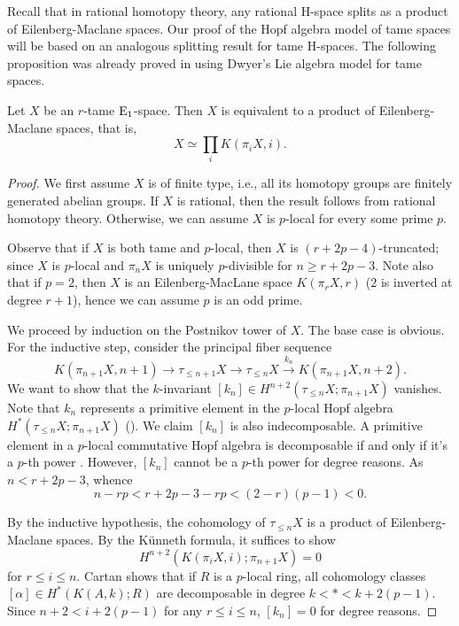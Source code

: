 Recall that in rational homotopy theory, any rational H-space splits as a product of Eilenberg-Maclane spaces.
Our proof of the Hopf algebra model of tame spaces will be based on an analogous splitting result for tame H-spaces. 
The following proposition was already proved in \cite[Proposition 1.7]{Scheerer-Tanre} using Dwyer's Lie algebra model for tame spaces. 
\begin{proposition}
\label{Decomp of tame H-spaces}
	Let $X$ be an $r$-tame $\operatorname{E}_1$-space. Then $X$ is equivalent to a product of Eilenberg-Maclane spaces, that is, 
	\[
	X \simeq \prod_i K(\pi_i X, i).
	\]
\end{proposition}
\pagebreak
\begin{proof}
We first assume $X$ is of finite type, i.e., all its homotopy groups are finitely generated abelian groups. If $X$ is rational, then the result follows from rational homotopy theory. Otherwise, we can assume $X$ is $p$-local for every some prime $p$.

Observe that if $X$ is both tame and $p$-local, then $X$ is $(r+2p-4)$-truncated; since $X$ is $p$-local and $\pi_{n}X$ is uniquely $p$-divisible for $n \geq r+2p-3$. Note also that if $p=2$, then $X$ is an Eilenberg-MacLane space $K(\pi_r X, r)$ ($2$ is inverted at degree $r+1$), hence we can assume $p$ is an odd prime. 

We proceed by induction on the Postnikov tower of $X$.
The base case is obvious. 	
For the inductive step, consider the principal fiber sequence
$$
K(\pi_{n+1}X,n+1)\to 
\tau_{\leq n+1}X
\to
\tau_{\leq n}X
\xrightarrow{k_n}
K(\pi_{n+1}X,n+2).
$$
We want to show that the $k$-invariant $[k_n]\in H^{n+2}(\tau_{\leq n}X; \pi_{n+1}X)$ vanishes. 
Note that $k_n$ represents a primitive element in the $p$-local Hopf algebra $H^*(\tau_{\leq n}X; \pi_{n+1}X)$ (\cite[Theorem 3.2]{D.Kahn}).
We claim $[k_n]$ is also indecomposable.
A primitive element in a $p$-local commutative Hopf algebra is decomposable if and only if it's a $p$-th power \cite[Proposition 4.21]{Milnor-Moore}.
However, $[k_n]$ cannot be a $p$-th power for degree reasons. As
$n<r+2p-3$, whence
\[
n-rp<r+2p-3-rp< (2-r)(p-1)<0.
\]
	
By the inductive hypothesis, the cohomology of $\tau_{\leq n} X$ is a product of Eilenberg-Maclane spaces. By the K\"{u}nneth formula, 
it suffices to show 
$$
H^{n+2}(K(\pi_i X, i); \pi_{n+1}X) = 0
$$
for $r\leq i \leq n$.
Cartan \cite{Cartan_I} shows that if $R$ is a $p$-local ring, all cohomology classes  $[\alpha]\in H^{*}(K(A,k);R)$ are decomposable in degree $k<*<k+2(p-1)$. 
Since $n+2 < i + 2(p-1)$ for any $r\leq i \leq n$,
$[k_n]=0$ for degree reasons.


\end{proof}
